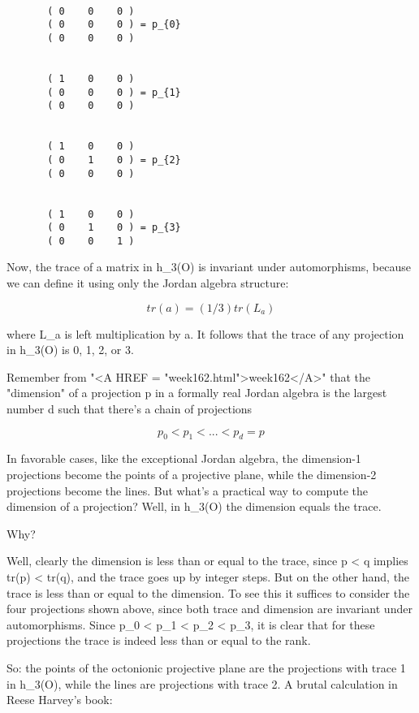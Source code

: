 \begin{verbatim}

       ( 0    0    0 )        
       ( 0    0    0 ) = p_{0} 
       ( 0    0    0 )


       ( 1    0    0 )        
       ( 0    0    0 ) = p_{1} 
       ( 0    0    0 ) 


       ( 1    0    0 )        
       ( 0    1    0 ) = p_{2} 
       ( 0    0    0 )


       ( 1    0    0 )       
       ( 0    1    0 ) = p_{3} 
       ( 0    0    1 )
\end{verbatim}
    

Now, the trace of a matrix in h_{3}(O) is invariant under
automorphisms, because we can define it using only the Jordan algebra
structure:


$$

tr(a) = (1/3) tr(L_{a})    
$$
    
where L_{a} is left multiplication by a.  It follows that the trace
of any projection in h_{3}(O) is 0, 1, 2, or 3.  

Remember from "<A HREF = "week162.html">week162</A>" that the
"dimension" of a projection p in a formally real Jordan
algebra is the largest number d such that there's a chain of projections


$$

         p_{0} < p_{1} < ... < p_{d} = p  
$$
    
In favorable cases, like the exceptional Jordan algebra, the dimension-1
projections become the points of a projective plane, while the
dimension-2 projections become the lines.  But what's a practical way to
compute the dimension of a projection?  Well, in h_{3}(O) the
dimension equals the trace.

Why?  

Well, clearly the dimension is less than or equal to the trace, since p
< q implies tr(p) < tr(q), and the trace goes up by integer steps.
But on the other hand, the trace is less than or equal to the dimension.
To see this it suffices to consider the four projections shown above,
since both trace and dimension are invariant under automorphisms.  Since
p_{0} < p_{1} < p_{2} < p_{3}, it is clear that for these projections
the trace is indeed less than or equal to the rank.

So: the points of the octonionic projective plane are the projections
with trace 1 in h_{3}(O), while the lines are projections with
trace 2.  A brutal calculation in Reese Harvey's book:

